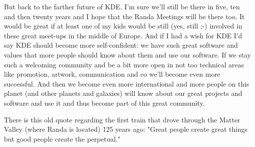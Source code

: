 But back to the farther future of KDE. I'm sure we'll still be there in five, ten and then twenty years and I hope that the Randa Meetings will be there too. It would be great if at least one of my kids would be still (yes, still ;-) involved in these great meet-ups in the middle of Europe. And if I had a wish for KDE I'd say KDE should become more self-confident: we have such great software and values that more people should know about them and use our software. If we stay such a welcoming community and be a bit more open in not too technical areas like promotion, artwork, communication and co we'll become even more successful. And then we become even more international and more people on this planet (and other planets and galaxies) will know about our great projects and software and use it and thus become part of this great community.

There is this old quote regarding the first train that drove through the Matter Valley (where Randa is located) 125 years ago: "Great people create great things but good people create the perpetual."